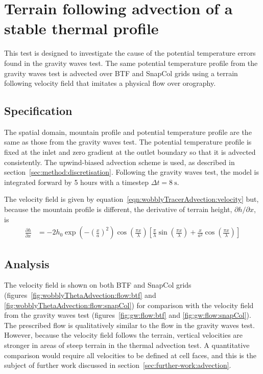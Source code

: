 \section{Terrain following advection of a stable thermal profile}
\label{sec:wobblyThetaAdvection}

This test is designed to investigate the cause of the potential temperature errors found in the gravity waves test.  The same potential temperature profile from the gravity waves test is advected over BTF and SnapCol grids using a terrain following velocity field that imitates a physical flow over orography.

\subsection{Specification}
The spatial domain, mountain profile and potential temperature profile are the same as those from the gravity waves test.  The potential temperature profile is fixed at the inlet and zero gradient at the outlet boundary so that it is advected consistently.  The upwind-biased advection scheme is used, as described in section~\ref{sec:method:discretisation}.  Following the gravity waves test, the model is integrated forward by 5 hours with a timestep $\Delta t = \SI{8}{\second}$. 

The velocity field is given by equation~\ref{eqn:wobblyTracerAdvection:velocity} but, because the mountain profile is different, the derivative of terrain height, $\partial h / \partial x$, is
\begin{align}
\frac{\partial h}{\partial x} &= - 2 h_0 \exp \left( - \left( \frac{x}{a} \right)^2 \right) \cos \left( \frac{\pi x}{\lambda} \right) \left[
\frac{\pi}{\lambda} \sin \left(\frac{\pi x}{\lambda} \right) +
\frac{x}{a^2} \cos \left( \frac{\pi x}{\lambda} \right) \right]
\end{align}

\subsection{Analysis}
The velocity field is shown on both BTF and SnapCol grids (figures~\ref{fig:wobblyThetaAdvection:flow:btf} and \ref{fig:wobblyThetaAdvection:flow:snapCol}) for comparison with the velocity field from the gravity waves test (figures~\ref{fig:gw:flow:btf} and \ref{fig:gw:flow:snapCol}).  The prescribed flow is qualitatively similar to the flow in the gravity waves test.  However, because the velocity field follows the terrain, vertical velocities are stronger in areas of steep terrain in the thermal advection test.  A quantitative comparison would require all velocities to be defined at cell faces, and this is the subject of further work discussed in section~\ref{sec:further-work:advection}.

